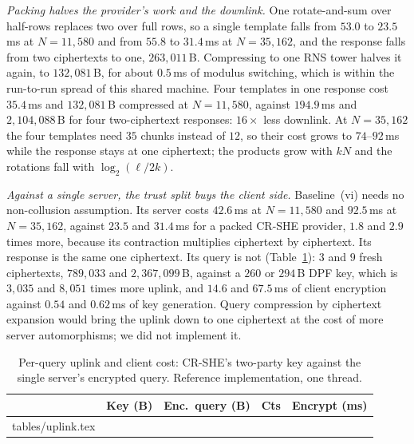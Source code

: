 \documentclass[a4paper,fleqn]{cas-sc}
\begin{document}
\emph{Packing halves the provider's work and the downlink.} One rotate-and-sum
over half-rows replaces two over full rows, so a single template falls from
$53.0$ to $23.5$\,ms at $N=11{,}580$ and from $55.8$ to $31.4$\,ms at
$N=35{,}162$, and the response falls from two ciphertexts to one,
$263{,}011$\,B. Compressing to one RNS tower halves it again, to
$132{,}081$\,B, for about $0.5$\,ms of modulus switching, which is within the
run-to-run spread of this shared machine. Four templates in one response cost
$35.4$\,ms and $132{,}081$\,B compressed at $N=11{,}580$, against $194.9$\,ms
and $2{,}104{,}088$\,B for four two-ciphertext responses: $16\times$ less downlink.
At $N=35{,}162$ the four templates need $35$ chunks instead of $12$, so their
cost grows to $74$--$92$\,ms while the response stays at one ciphertext; the
products grow with $kN$ and the rotations fall with $\log_2(\ell/2k)$.

\emph{Against a single server, the trust split buys the client side.}
Baseline~(vi) needs no non-collusion assumption. Its server costs $42.6$\,ms
at $N=11{,}580$ and $92.5$\,ms at $N=35{,}162$, against $23.5$ and $31.4$\,ms
for a packed CR-SHE provider, $1.8$ and $2.9$ times more, because its
contraction multiplies ciphertext by ciphertext. Its response is the same one
ciphertext. Its query is not (Table~\ref{tab:uplink}): $3$ and $9$ fresh
ciphertexts, $789{,}033$ and $2{,}367{,}099$\,B, against a $260$ or $294$\,B
DPF key, which is $3{,}035$ and $8{,}051$ times more uplink, and $14.6$ and
$67.5$\,ms of client encryption against $0.54$ and $0.62$\,ms of key
generation. Query compression by ciphertext expansion \citep{angel2018pir}
would bring the uplink down to one ciphertext at the cost of more server
automorphisms; we did not implement it.

\begin{table}[pos=htbp]
\caption{Per-query uplink and client cost: CR-SHE's two-party key against the
single server's encrypted query. Reference implementation, one thread.}
\label{tab:uplink}
\centering
\footnotesize
\setlength{\tabcolsep}{3pt}
\begin{tabular*}{\tblwidth}{@{\extracolsep{\fill}}lcccc@{}}
\toprule
 & Key (B) & Enc.\ query (B) & Cts & Encrypt (ms) \\
\midrule
{} tables/uplink.tex 
\bottomrule
\end{tabular*}
\end{table}
\end{document}
